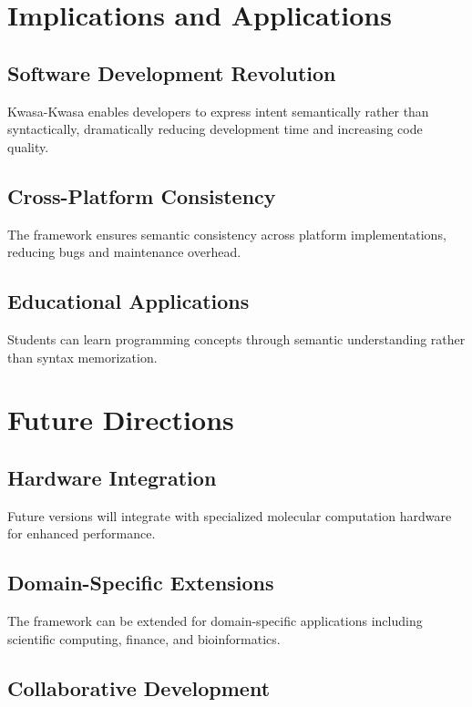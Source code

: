 \documentclass[12pt,a4paper]{article}
\begin{document}
\section{Implications and Applications}

\subsection{Software Development Revolution}

Kwasa-Kwasa enables developers to express intent semantically rather than syntactically, dramatically reducing development time and increasing code quality.

\subsection{Cross-Platform Consistency}

The framework ensures semantic consistency across platform implementations, reducing bugs and maintenance overhead.

\subsection{Educational Applications}

Students can learn programming concepts through semantic understanding rather than syntax memorization.

\section{Future Directions}

\subsection{Hardware Integration}

Future versions will integrate with specialized molecular computation hardware for enhanced performance.

\subsection{Domain-Specific Extensions}

The framework can be extended for domain-specific applications including scientific computing, finance, and bioinformatics.

\subsection{Collaborative Development}
\end{document}
